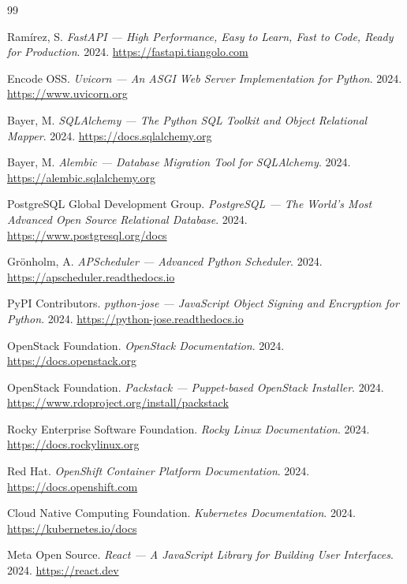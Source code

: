 \documentclass[11pt,a4paper]{report}
\begin{document}

\normalsize{}\setlength{\parskip}{4pt}

\makeatletter
\renewcommand{\@biblabel}[1]{\textbullet}
\makeatother

\begin{thebibliography}{99}

Ramírez, S.
\textit{FastAPI — High Performance, Easy to Learn, Fast to Code, Ready for Production}.
2024.
\url{https://fastapi.tiangolo.com}

Encode OSS.
\textit{Uvicorn — An ASGI Web Server Implementation for Python}.
2024.
\url{https://www.uvicorn.org}

Bayer, M.
\textit{SQLAlchemy — The Python SQL Toolkit and Object Relational Mapper}.
2024.
\url{https://docs.sqlalchemy.org}

Bayer, M.
\textit{Alembic — Database Migration Tool for SQLAlchemy}.
2024.
\url{https://alembic.sqlalchemy.org}

PostgreSQL Global Development Group.
\textit{PostgreSQL — The World's Most Advanced Open Source Relational Database}.
2024.
\url{https://www.postgresql.org/docs}

Grönholm, A.
\textit{APScheduler — Advanced Python Scheduler}.
2024.
\url{https://apscheduler.readthedocs.io}

PyPI Contributors.
\textit{python-jose — JavaScript Object Signing and Encryption for Python}.
2024.
\url{https://python-jose.readthedocs.io}

OpenStack Foundation.
\textit{OpenStack Documentation}.
2024.
\url{https://docs.openstack.org}

OpenStack Foundation.
\textit{Packstack — Puppet-based OpenStack Installer}.
2024.
\url{https://www.rdoproject.org/install/packstack}

Rocky Enterprise Software Foundation.
\textit{Rocky Linux Documentation}.
2024.
\url{https://docs.rockylinux.org}

Red Hat.
\textit{OpenShift Container Platform Documentation}.
2024.
\url{https://docs.openshift.com}

Cloud Native Computing Foundation.
\textit{Kubernetes Documentation}.
2024.
\url{https://kubernetes.io/docs}

Meta Open Source.
\textit{React — A JavaScript Library for Building User Interfaces}.
2024.
\url{https://react.dev}


\end{thebibliography}
\end{document}
